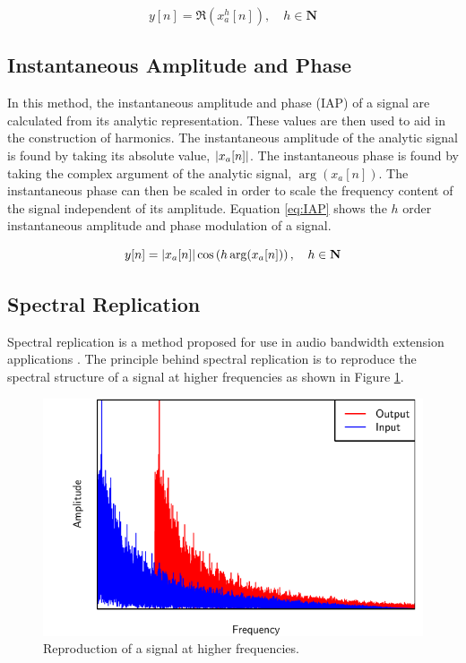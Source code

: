 		\begin{equation}
			y[n] = \Re \left( x_{a}^{h}[n] \right), \quad h \in \textbf{N}
			\label{eq:SSB}
		\end{equation}

	\subsection{Instantaneous Amplitude and Phase}
	\label{sec:Excitation-Methods-IAP}
		In this method, the instantaneous amplitude and phase (IAP) of a signal are calculated from its analytic
		representation. These values are then used to aid in the construction of harmonics. The instantaneous
		amplitude of the analytic signal is found by taking its absolute value, $\left|x_{a}[n]\right|$. The instantaneous
		phase is found by taking the complex argument of the analytic signal, $\arg(x_{a}[n])$. The instantaneous
		phase can then be scaled in order to scale the frequency content of the signal independent of its amplitude.
		Equation \ref{eq:IAP} shows the $h$ order instantaneous amplitude and phase modulation of a
		signal.

		\begin{equation}
			y[n] = \left|x_{a}[n]\right| \cos \left( h\arg(x_{a}[n]) \right), \quad h \in \textbf{N}
			\label{eq:IAP}
		\end{equation}

	\subsection{Spectral Replication}
	\label{sec:Excitation-Methods-SpectralReplication}
		Spectral replication is a method proposed for use in audio bandwidth extension applications
		\citep{nagel2010a}. The principle behind spectral replication is to reproduce the spectral structure of a
		signal at higher frequencies as shown in Figure \ref{fig:SpectralReplication}.

		\begin{figure}[h!]
			\centering
			\includegraphics{chapter3/Images/SpectralReplicationSpectrum.pdf}
			\caption{Reproduction of a signal at higher frequencies.}
			\label{fig:SpectralReplication}
		\end{figure}

